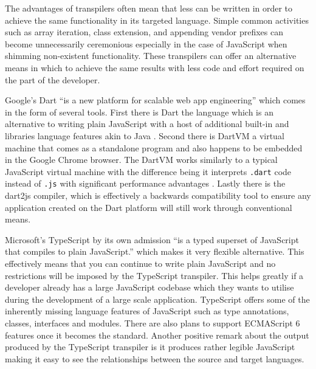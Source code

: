 \documentclass[final]{cmpreport}
\begin{document}

The advantages of transpilers often mean that less can be written in order to achieve the same functionality in its targeted language. Simple common activities such as array iteration, class extension, and appending vendor prefixes can become unnecessarily ceremonious especially in the case of JavaScript when shimming non-existent functionality. These transpilers can offer an alternative means in which to achieve the same results with less code and effort required on the part of the developer.

Google's Dart ``is a new platform for scalable web app engineering'' which comes in the form of several tools. First there is Dart the language which is an alternative to writing plain JavaScript with a host of additional built-in and libraries language features akin to Java \cite{Fortuna}. Second there is DartVM a virtual machine that comes as a standalone program and also happens to be embedded in the Google Chrome browser. The DartVM works similarly to a typical JavaScript virtual machine with the difference being it interprets \texttt{.dart} code instead of \texttt{.js} with significant performance advantages \cite{Schneider}. Lastly there is the dart2js compiler, which is effectively a backwards compatibility tool to ensure any application created on the Dart platform will still work through conventional means.

Microsoft's TypeScript by its own admission ``is a typed superset of JavaScript that compiles to plain JavaScript.'' which makes it very flexible alternative. This effectively means that you can continue to write plain JavaScript and no restrictions will be imposed by the TypeScript transpiler. This helps greatly if a developer already has a large JavaScript codebase which they wants to utilise during the development of a large scale application. TypeScript offers some of the inherently missing language features of JavaScript such as type annotations, classes, interfaces and modules. There are also plans to support ECMAScript 6 features once it becomes the standard. Another positive remark about the output produced by the TypeScript transpiler is it produces rather legible JavaScript making it easy to see the relationships between the source and target languages.
\end{document}
